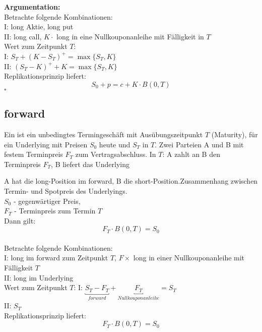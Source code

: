 \textbf{Argumentation:} \\
Betrachte folgende Kombinationen:\\
I: long Aktie, long put\\
II: long call, $K \cdot $ long in eine Nullkouponanleihe mit Fälligkeit in $T$\\

Wert zum Zeitpunkt $T$: \\
I: $S_T + (K-S_T)^+ = \max\{S_T,K\}$ \\
II: $(S_T - K)^+ + K = \max\{S_T,K\}$ \\

Replikationsprinzip liefert:
\[
	S_0 + p = c + K \cdot B(0,T)
\]
\hfill $\square$


\subsection{forward} %
\label{sub:forward}

Ein  ist ein unbedingtes Termingeschäft mit Ausübungszeitpunkt $T$ (Maturity), für ein Underlying mit Preisen $S_0$ heute und $S_T$ in $T$. 
Zwei Parteien A und B mit festem Terminpreis $F_T$ zum Vertragsabschluss. 
In $T$: A zahlt an B den Terminpreis $F_T$, B liefert das Underlying

A hat die long-Position im forward, B die short-Position.Zusammenhang zwischen Termin- und Spotpreis des Underlyings.\\
\hspace{2cm} $S_0$ - gegenwärtiger Preis, \\
\hspace{2cm} $F_T$ - Terminpreis zum Termin $T$\\
Dann gilt:
\[ F_T \cdot B(0,T) = S_0\]
\\
Betrachte folgende Kombinationen:\\
I: long im forward zum Zeitpunkt $T$, $F \times$ long in einer Nullkouponanleihe mit Fälligkeit $T$\\
II: long im Underlying\\
Wert zum Zeitpunkt $T$:
I: $\underbracket{S_T - F_T}_{forward} + \underbracket{F_T}_{Nullkouponanleihe} = S_T$\\
II: $S_T$\\
Replikationsprinzip liefert:
\[F_T \cdot B(0,T) = S_0 \]


